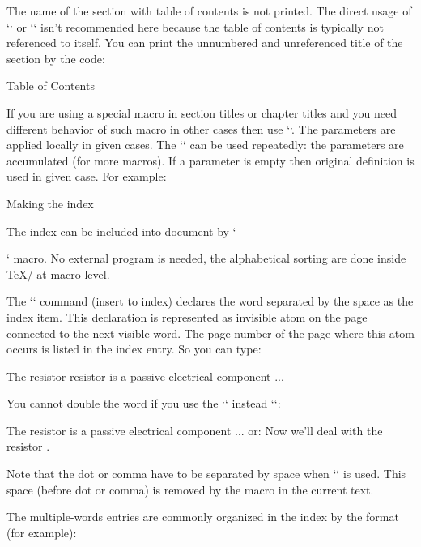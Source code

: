 {The name of the section with table of contents is not printed. The direct usage
of `\chap` or `\sec` isn't recommended here because the table of contents 
is typically not referenced to itself. You can print the unnumbered and unreferenced
title of the section by the code:

\begtt
\nonum\notoc\sec Table of Contents
\endtt

\new
If you are using a special macro in section titles or chapter titles 
and you need different behavior of such macro in other cases then use 
``.
The parameters are applied locally in given cases. The `\regmacro` can be
used repeatedly: the parameters are accumulated (for more macros). 
If a parameter is empty then original definition is used in given case.
For example:

\begtt
\def\mylogo{\leavevmode\hbox{\Red{\it My}\Black{\setfontsize{mag1.5}\rm Lo}Go}}
\regmacro {\def\mylogo{\hbox{\Red My\Black LoGo}}} %
          {\def\mylogo{\hbox{{\it My}\/LoGo}}}     %
          {\def\mylogo{MyLoGo}}                    %
\endtt

\secc Making the index 

The index can be included into document by `\makeindex` macro. No external
program is needed, the alphabetical sorting are done inside \TeX/ at macro
level.

The `\ii` command (insert to index) declares the word separated by the space
as the index item. This declaration is represented as invisible atom on the
page connected to the next visible word. The page number of the page where
this atom occurs is listed in the index entry. So you can type:

\begtt
The \ii resistor resistor is a passive electrical component ...
\endtt

You cannot double the word if you use the `\iid` instead `\ii`:

\begtt
The \iid resistor is a passive electrical component ...
or:
Now we'll deal with the \iid resistor .
\endtt

Note that the dot or comma have to be separated by space when `\iid` is
used. This space (before dot or comma) is removed by the macro in 
the current text.

The multiple-words entries are commonly organized in the index by the format
(for example): 

}
